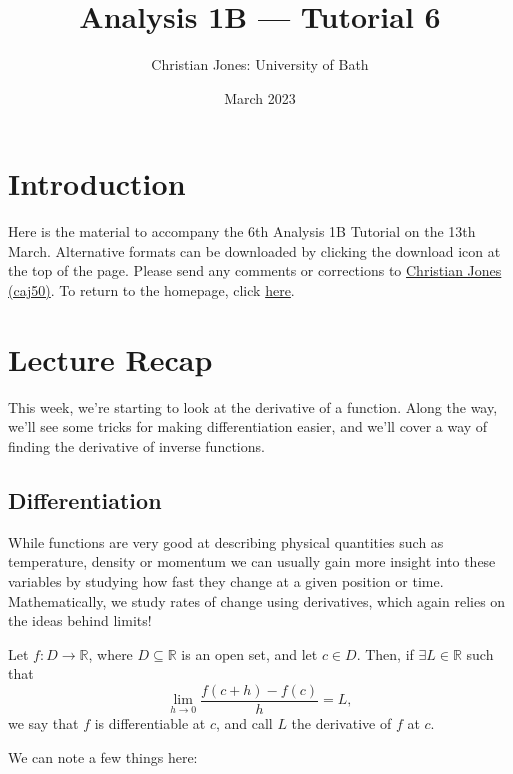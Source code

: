 \documentclass[
  10pt,
  a4paper]{article}
\title{Analysis 1B --- Tutorial 6}
\author{Christian Jones: University of Bath}
\date{March 2023}
\theoremstyle{plain}
\theoremstyle{definition}
\theoremstyle{plain}
\theoremstyle{plain}
\theoremstyle{plain}
\theoremstyle{plain}
\theoremstyle{definition}
\theoremstyle{definition}
\theoremstyle{remark}
\theoremstyle{remark}
\let\BeginKnitrBlock\begin \let\EndKnitrBlock\end
\begin{document}
\maketitle

{
\setcounter{tocdepth}{2}
\tableofcontents
}
\newpage
{}

\hypertarget{introduction}{%
\section*{Introduction}\label{introduction}}

Here is the material to accompany the 6th Analysis 1B Tutorial on the 13th March. Alternative formats can be downloaded by clicking the download icon at the top of the page. Please send any comments or corrections to \href{mailto:caj50@bath.ac.uk}{Christian Jones (caj50)}. To return to the homepage, click \href{http://caj50.github.io/tutoring.html}{here}.

\hypertarget{lecture-recap}{%
\section{Lecture Recap}\label{lecture-recap}}

This week, we're starting to look at the derivative of a function. Along the way, we'll see some tricks for making differentiation easier, and we'll cover a way of finding the derivative of inverse functions.

\hypertarget{differentiation}{%
\subsection{Differentiation}\label{differentiation}}

While functions are very good at describing physical quantities such as temperature, density or momentum we can usually gain more insight into these variables by studying how fast they change at a given position or time. Mathematically, we study rates of change using derivatives, which again relies on the ideas behind limits!

\BeginKnitrBlock{definition}[Derivative]
{\label{def:def1} }Let \(f: D \to \mathbb{R}\), where \(D \subseteq \mathbb{R}\) is an open set, and let \(c \in D\). Then, if \(\exists L \in \mathbb{R}\) such that \[\lim_{h \to 0}\frac{f(c+h) - f(c)}{h} = L,\] we say that \(f\) is differentiable at \(c\), and call \(L\) the derivative of \(f\) at \(c\).
\EndKnitrBlock{definition}
We can note a few things here:
\end{document}
